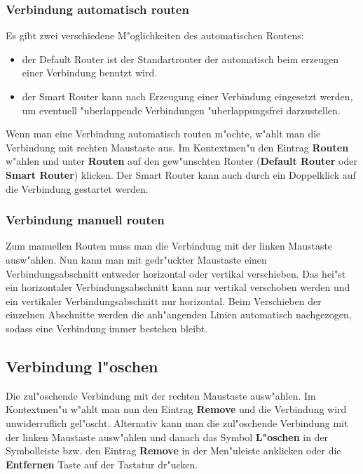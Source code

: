 \documentclass[a4paper,titlepage,12pt,ngerman]{scrbook}
\begin{document}
\subsubsection{Verbindung automatisch routen}
Es gibt zwei verschiedene M"oglichkeiten des automatischen Routens:
\begin{itemize}
\item der Default Router ist der Standartrouter der automatisch beim erzeugen einer Verbindung benutzt wird.
\item der Smart Router kann nach Erzeugung einer Verbindung eingesetzt werden, um eventuell "uberlappende Verbindungen "uberlappungsfrei darzustellen.
\end{itemize}
Wenn man eine Verbindung automatisch routen m"ochte, w"ahlt man die Verbindung mit rechten Maustaste aus. Im Kontextmen"u den Eintrag {\bf Routen} w"ahlen und unter {\bf Routen} auf den gew"unschten Router ({\bf Default Router} oder {\bf Smart Router}) klicken.\newline
Der Smart Router kann auch durch ein Doppelklick auf die Verbindung gestartet werden.

\subsubsection{Verbindung manuell routen}
Zum manuellen Routen muss man die Verbindung mit der linken Maustaste ausw"ahlen. Nun kann man mit gedr"uckter Maustaste einen Verbindungsabschnitt entweder horizontal oder vertikal verschieben. Das hei"st ein horizontaler Verbindungsabschnitt kann nur vertikal verschoben werden und ein vertikaler Verbindungsabschnitt nur horizontal. Beim Verschieben der einzelnen Abschnitte werden die anh"angenden Linien automatisch nachgezogen, sodass eine Verbindung immer bestehen bleibt.

\subsection{Verbindung l"oschen}
Die zul"oschende Verbindung mit der rechten Maustaste ausw"ahlen. Im Kontextmen"u w"ahlt man nun den Eintrag {\bf Remove} und die Verbindung wird unwiderruflich gel"oscht.
Alternativ kann man die zul"oschende Verbindung mit der linken Maustaste ausw"ahlen und danach das Symbol {\bf L"oschen} in der Symbolleiste bzw. den Eintrag {\bf Remove} in der Men"uleiste anklicken oder die {\bf Entfernen} Taste auf der Tastatur dr"ucken.
\end{document}
